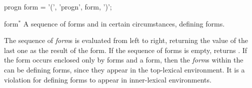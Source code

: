 \begin{optDefinition}
%
\Syntax
\savesyntax\prognSyntax\vbox{\syntax
progn form
   = '(', 'progn', {form}, ')';
\endsyntax}
%
\begin{arguments}
    \item[form\/$^*$] A sequence of forms and in certain circumstances, defining
    forms.
\end{arguments}
%
\result%
The sequence of {\em form}s is evaluated from left to right, returning the value
of the last one as the result of the  form.  If the sequence
of forms is empty,  returns \nil{}.
%
\remarks%
If the  form occurs enclosed only by  forms
and a  form, then the {\em form}s within the
 can be defining forms, since they appear in the top-lexical
environment.  It is a violation for defining forms to appear in inner-lexical
environments.

%


\end{optDefinition}
